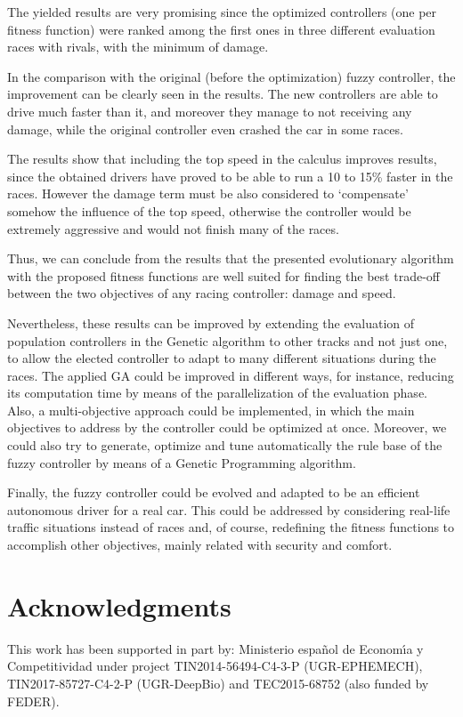 \documentclass[conference]{IEEEtran}
\begin{document}
The yielded results are very promising since the optimized controllers (one per fitness function) were ranked among the first ones in three different evaluation races with rivals, with the minimum of damage.

In the comparison with the original (before the optimization) fuzzy controller, the improvement can be clearly seen in the results. The new controllers are able to drive much faster than it, and moreover they manage to not receiving any damage, while the original controller even crashed the car in some races.

The results show that including the top speed in the calculus improves
results, since the obtained drivers have proved to be able to run a 10
to 15\% faster in the races. However the damage term must be also
considered to `compensate' somehow the influence of the top speed,
otherwise the controller would be extremely aggressive and would not
finish many of the races.

Thus, we can conclude from the results that the presented evolutionary
algorithm with the
proposed fitness functions are well suited for finding the best
trade-off between the two objectives of any racing controller: damage
and speed. 

Nevertheless, these results can be improved by extending the
evaluation of population controllers in the Genetic algorithm to other
tracks and not just one, to allow the elected controller to adapt to many different situations during the races.
The applied GA could be improved in different ways, for instance, reducing its computation time by means of the parallelization of the evaluation phase.
Also, a multi-objective approach could be implemented, in which the main objectives to address by the controller could be optimized at once.
Moreover, we could also try to generate, optimize and tune
automatically the rule base of the fuzzy controller by means of a
Genetic Programming algorithm.  

Finally, the fuzzy controller could be evolved and adapted to be an efficient autonomous driver for a real car. This could be addressed by considering real-life traffic situations instead of races and, of course, redefining the fitness functions to accomplish other objectives, mainly related with security and comfort.

\section*{Acknowledgments}

This work has been supported in part by: Ministerio espa\~{n}ol de
Econom\'{\i}a y Competitividad under project TIN2014-56494-C4-3-P
(UGR-EPHEMECH), TIN2017-85727-C4-2-P (UGR-DeepBio) and TEC2015-68752 (also funded by FEDER).




\end{document}
